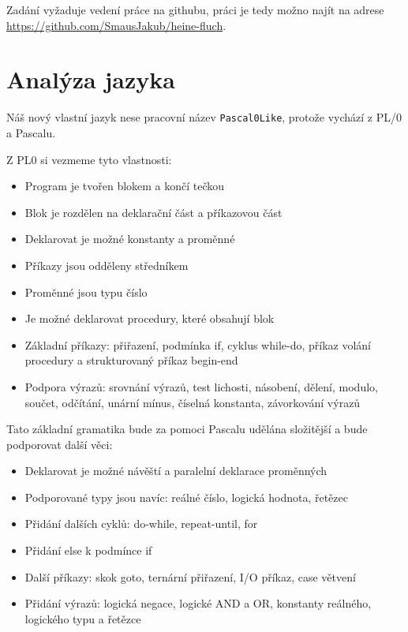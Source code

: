 \documentclass[
12pt,
a4paper,
pdftex,
czech,
titlepage
]{report}
\begin{document}
Zadání vyžaduje vedení práce na githubu, práci je tedy možno najít na adrese \href{https://github.com/SmausJakub/heine-fluch}{https://github.com/SmausJakub/heine-fluch}.

\section{Analýza jazyka}

Náš nový vlastní jazyk nese pracovní název \texttt{Pascal0Like}, protože vychází z PL/0 a Pascalu.

Z PL0 si vezmeme tyto vlastnosti:
\begin{itemize}
\item Program je tvořen blokem a končí tečkou
\item Blok je rozdělen na deklarační část a příkazovou část
\item Deklarovat je možné konstanty a proměnné
\item Příkazy jsou odděleny středníkem
\item Proměnné jsou typu číslo
\item Je možné deklarovat procedury, které obsahují blok
\item Základní příkazy: přiřazení, podmínka if, cyklus while-do, příkaz volání procedury a strukturovaný příkaz begin-end
\item Podpora výrazů: srovnání výrazů, test lichosti, násobení, dělení, modulo, součet, odčítání, unární mínus, číselná konstanta, závorkování výrazů
\end{itemize}

Tato základní gramatika bude za pomoci Pascalu udělána složitější a bude podporovat další věci:

\begin{itemize}
\item Deklarovat je možné návěští a paralelní deklarace proměnných
\item Podporované typy jsou navíc: reálné číslo, logická hodnota, řetězec
\item Přidání dalších cyklů: do-while, repeat-until, for
\item Přidání else k podmínce if
\item Další příkazy: skok goto, ternární přiřazení, I/O příkaz, case větvení
\item Přidání výrazů: logická negace, logické AND a OR, konstanty reálného, logického typu a řetězce
\end{itemize}
\end{document}
